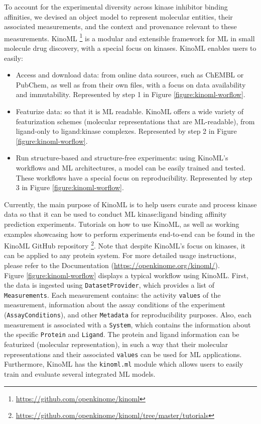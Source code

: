 \documentclass[9pt,lessons]{livecoms}
\begin{document}
To account for the experimental diversity across kinase inhibitor binding affinities, we devised an object model to represent molecular entities, their associated measurements, and the context and provenance relevant to these measurements. %
KinoML \footnote{\url{https://github.com/openkinome/kinoml}} is a modular and extensible framework for ML in small molecule drug discovery, with a special focus on kinases. KinoML enables users to easily:
\begin{itemize}
    \item  Access and download data: from online data sources, such as ChEMBL or PubChem, as well as from their own files, with a focus on data availability and immutability. Represented by step 1 in Figure \ref{figure:kinoml-worflow}.
    \item Featurize data: so that it is ML readable. KinoML offers a wide variety of featurization schemes (molecular representations that are ML-readable), from ligand-only to ligand:kinase complexes. Represented by step 2 in Figure \ref{figure:kinoml-worflow}.
    \item Run structure-based and structure-free experiments: using KinoML's workflows and ML architectures, a model can be easily trained and tested. These workflows have a special focus on reproducibility. Represented by step 3 in Figure \ref{figure:kinoml-worflow}.
\end{itemize}
Currently, the main purpose of KinoML is to help users curate and process kinase data so that it can be used to conduct ML kinase:ligand binding affinity prediction experiments. Tutorials on how to use KinoML, as well as working examples showcasing how to perform experiments end-to-end can be found in the KinoML GitHub repository \footnote{\url{https://github.com/openkinome/kinoml/tree/master/tutorials}}. Note that despite KinoML's focus on kinases, it can be applied to any protein system. For more detailed usage instructions, please refer to the Documentation (\url{https://openkinome.org/kinoml/}). \\
Figure \ref{figure:kinoml-worflow} displays a typical workflow using KinoML. First, the data is ingested using \texttt{DatasetProvider}, which provides a list of \texttt{Measurements}. Each measurement contains: the activity \texttt{values} of the measurement, information about the assay conditions of the experiment (\texttt{AssayConditions}), and other \texttt{Metadata} for reproducibility purposes. Also, each measurement is associated with a \texttt{System}, which contains the information about the specific \texttt{Protein} and \texttt{Ligand}. The protein and ligand information can be featurized (molecular representation), in such a way that their molecular representations and their associated \texttt{values} can be used for ML applications. Furthermore, KinoML has the \texttt{kinoml.ml} module which allows users to easily train and evaluate several integrated ML models.
\end{document}
